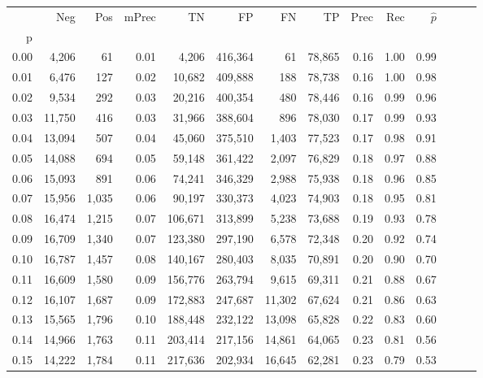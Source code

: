 \begin{tabular}{rrrrrrrrrrrrrr}
\toprule
{} &     Neg &    Pos & mPrec &       TN &       FP &      FN &      TP &  Prec &   Rec & $\hat{p}$ \\
p    &         &        &       &          &          &         &         &       &       &           \\
\midrule
0.00 &   4,206 &     61 &  0.01 &    4,206 &  416,364 &      61 &  78,865 &  0.16 &  1.00 &      0.99 \\
0.01 &   6,476 &    127 &  0.02 &   10,682 &  409,888 &     188 &  78,738 &  0.16 &  1.00 &      0.98 \\
0.02 &   9,534 &    292 &  0.03 &   20,216 &  400,354 &     480 &  78,446 &  0.16 &  0.99 &      0.96 \\
0.03 &  11,750 &    416 &  0.03 &   31,966 &  388,604 &     896 &  78,030 &  0.17 &  0.99 &      0.93 \\
0.04 &  13,094 &    507 &  0.04 &   45,060 &  375,510 &   1,403 &  77,523 &  0.17 &  0.98 &      0.91 \\
0.05 &  14,088 &    694 &  0.05 &   59,148 &  361,422 &   2,097 &  76,829 &  0.18 &  0.97 &      0.88 \\
0.06 &  15,093 &    891 &  0.06 &   74,241 &  346,329 &   2,988 &  75,938 &  0.18 &  0.96 &      0.85 \\
0.07 &  15,956 &  1,035 &  0.06 &   90,197 &  330,373 &   4,023 &  74,903 &  0.18 &  0.95 &      0.81 \\
0.08 &  16,474 &  1,215 &  0.07 &  106,671 &  313,899 &   5,238 &  73,688 &  0.19 &  0.93 &      0.78 \\
0.09 &  16,709 &  1,340 &  0.07 &  123,380 &  297,190 &   6,578 &  72,348 &  0.20 &  0.92 &      0.74 \\
0.10 &  16,787 &  1,457 &  0.08 &  140,167 &  280,403 &   8,035 &  70,891 &  0.20 &  0.90 &      0.70 \\
0.11 &  16,609 &  1,580 &  0.09 &  156,776 &  263,794 &   9,615 &  69,311 &  0.21 &  0.88 &      0.67 \\
0.12 &  16,107 &  1,687 &  0.09 &  172,883 &  247,687 &  11,302 &  67,624 &  0.21 &  0.86 &      0.63 \\
0.13 &  15,565 &  1,796 &  0.10 &  188,448 &  232,122 &  13,098 &  65,828 &  0.22 &  0.83 &      0.60 \\
0.14 &  14,966 &  1,763 &  0.11 &  203,414 &  217,156 &  14,861 &  64,065 &  0.23 &  0.81 &      0.56 \\
0.15 &  14,222 &  1,784 &  0.11 &  217,636 &  202,934 &  16,645 &  62,281 &  0.23 &  0.79 &      0.53 \\

\end{tabular}
